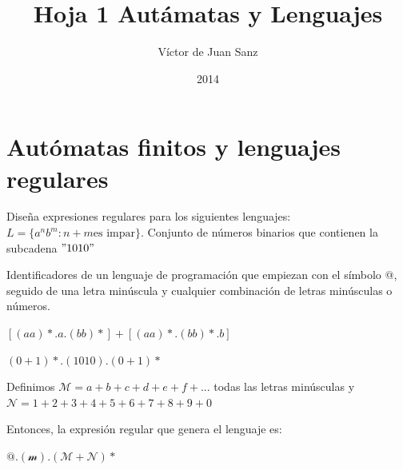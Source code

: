\documentclass[nochap]{apuntes}
\title{Hoja 1 Autámatas y Lenguajes}
\author{Víctor de Juan Sanz}
\date{2014}
\begin{document}
\maketitle
\section{Autómatas finitos y lenguajes regulares}
\begin{problem}[1]
Dise\~na expresiones regulares para los siguientes lenguajes:
\ppart $L = \{a^nb^m : n + m \text{es impar}\}.$
\ppart Conjunto de n\'umeros binarios que contienen la subcadena $"1010"$

\ppart Identificadores de un lenguaje de programaci\'on que empiezan con el s\'imbolo @, seguido de una letra min\'uscula y cualquier combinaci\'on de letras min\'usculas o n\'umeros.

\solution

\spart $\left[ (aa)*.a.(bb)* \right] + \left[ (aa)*.(bb)*.b\right]$

\spart
$(0+1)*.(1010).(0+1)*$

\spart
Definimos $\mathcal{M} = a+b+c+d+e+f+...$ todas las letras min\'usculas y \\
$\mathcal{N} = 1+2+3+4+5+6+7+8+9+0$

Entonces, la expresión regular que genera el lenguaje es: 

$@.(\mathcal{m}).(\mathcal{M}+\mathcal{N})*$



\end{problem}
\end{document}

